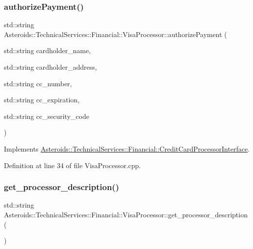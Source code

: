 \subsubsection{\texorpdfstring{authorize\+Payment()}{authorizePayment()}}
{\footnotesize\ttfamily std\+::string Asteroids\+::\+Technical\+Services\+::\+Financial\+::\+Visa\+Processor\+::authorize\+Payment (\begin{DoxyParamCaption}\item[{std\+::string}]{cardholder\+\_\+name,  }\item[{std\+::string}]{cardholder\+\_\+address,  }\item[{std\+::string}]{cc\+\_\+number,  }\item[{std\+::string}]{cc\+\_\+expiration,  }\item[{std\+::string}]{cc\+\_\+security\+\_\+code }\end{DoxyParamCaption})\hspace{0.3cm}{\ttfamily [virtual]}}



Implements \hyperlink{classAsteroids_1_1TechnicalServices_1_1Financial_1_1CreditCardProcessorInterface_a605de1c4a264b4f9ae94ed13dd5fe1c0}{Asteroids\+::\+Technical\+Services\+::\+Financial\+::\+Credit\+Card\+Processor\+Interface}.



Definition at line 34 of file Visa\+Processor.\+cpp.

\mbox{\label{classAsteroids_1_1TechnicalServices_1_1Financial_1_1VisaProcessor_a867ad9ef829698dc57e3f71ab7778945}} 
\subsubsection{\texorpdfstring{get\+\_\+processor\+\_\+description()}{get\_processor\_description()}}
{\footnotesize\ttfamily std\+::string Asteroids\+::\+Technical\+Services\+::\+Financial\+::\+Visa\+Processor\+::get\+\_\+processor\+\_\+description (\begin{DoxyParamCaption}{ }\end{DoxyParamCaption})\hspace{0.3cm}{\ttfamily [virtual]}}



